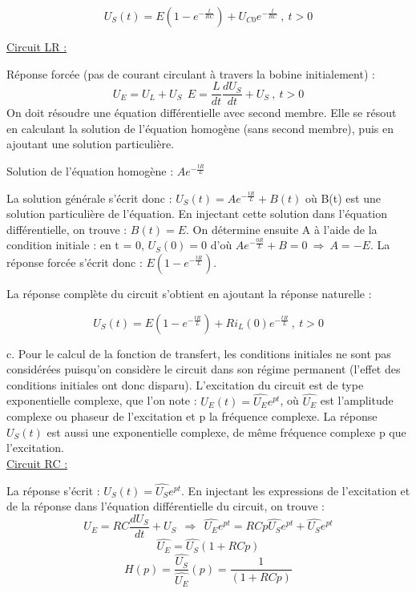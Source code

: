 \documentclass[11pt]{report}
\begin{document}
 	\begin{equation*}
 	U_S(t)=E(1-e^{-\frac{t}{RC}})+U_{C0}e^{-\frac{t}{RC}}~,~t>0
 	\end{equation*}
 	
 	\underline{Circuit LR :}
 	
 	
 	Réponse forcée (pas de courant circulant à travers la bobine initialement) : 
 	\begin{equation*}
 	U_E=U_L+U_S~~E=\frac{L}{dt}\frac{dU_S}{dt}+U_S~,~t>0
 	\end{equation*}
 	On doit résoudre une équation différentielle avec second membre. Elle se résout en calculant la solution de l'équation homogène (sans second membre), puis en ajoutant une solution particulière.
 	
 	Solution de l'équation homogène : $Ae^{-\frac{tR}{L}}$
 	
 	La solution générale s'écrit donc : $U_S(t)=Ae^{-\frac{tR}{L}}+B(t)$ où B(t) est une solution particulière de l'équation. En injectant cette solution dans l'équation différentielle, on trouve : $ B(t)=E$. On détermine ensuite A à l'aide de la condition initiale : en t = 0, $U_S(0)=0$ d'où $Ae^{-\frac{0R}{L}}+B=0~\Rightarrow~A=-E$. 
 	La réponse forcée s'écrit donc : $E(1-e^{-\frac{tR}{L}})$.
 	
 	La réponse complète du circuit s'obtient en ajoutant la réponse naturelle :
 	
 	\begin{equation*}
 	U_S(t)=E(1-e^{-\frac{tR}{L}})+Ri_L(0)e^{-\frac{tR}{L}}~,~t>0
 	\end{equation*}
 	
 	c. Pour le calcul de la fonction de transfert, les conditions initiales ne sont pas considérées puisqu'on considère le circuit dans son régime permanent (l'effet des conditions initiales ont donc disparu). L'excitation du circuit est de type exponentielle complexe, que l'on note : $U_E(t)=\hat{U_E}e^{pt}$, où $\hat{U_E}$ est l'amplitude complexe ou phaseur de l'excitation et p la fréquence complexe. La réponse $U_S(t)$ est aussi une exponentielle complexe, de même fréquence complexe p que l'excitation.\\
 	
 	\underline{Circuit RC :}
 	
 	La réponse s'écrit : $U_S(t)=\hat{U_S}e^{pt}$. En injectant les expressions de l'excitation et de la réponse dans l'équation différentielle du circuit, on trouve :
 	\begin{equation*}
 	U_E=RC\frac{dU_S}{dt}+U_S~~\Rightarrow~~\hat{U_E}e^{pt}=RCp\hat{U_S}e^{pt}+\hat{U_S}e^{pt}
 	\end{equation*}
 	\begin{equation*}
 	\hat{U_E}=\hat{U_S}(1+RCp)
 	\end{equation*}
	\begin{equation*}
	H(p)=\frac{\hat{U_S}}{\hat{U_E}}(p)=\frac{1}{(1+RCp)}
	\end{equation*}
	
\end{document}
